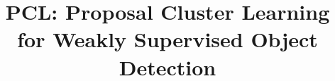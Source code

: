 \documentclass[10pt,journal,compsoc]{IEEEtran}
\begin{document}
%
\title{PCL: Proposal Cluster Learning for Weakly Supervised Object Detection}
%
%
%
%
\end{document}
